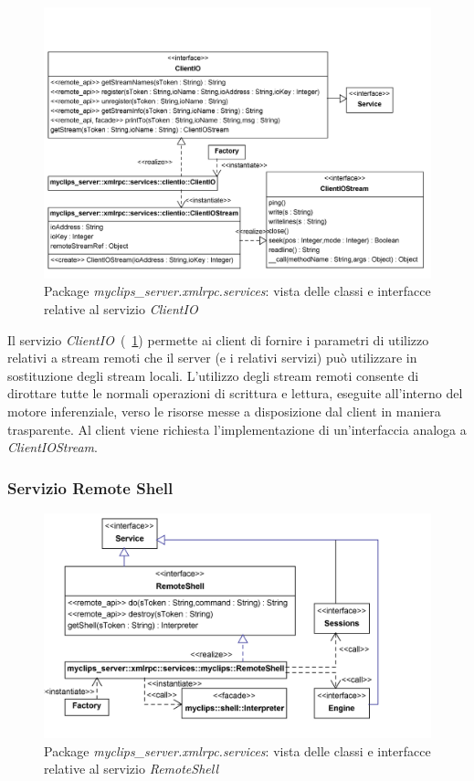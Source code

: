 \begin{figure}[h]
\centering
\includegraphics[width=1\textwidth]{Immagini/Capitolo3/Classi/myclips_server_services_ClientIO.png}
\caption{Package \emph{myclips\_server.xmlrpc.services}: vista delle classi e interfacce relative al servizio \emph{ClientIO}}\label{fig:class-myclips-server-services-clientio}
\end{figure}

Il servizio \emph{ClientIO}~(\figurename~\ref{fig:class-myclips-server-services-clientio}) permette ai client di fornire i parametri di utilizzo relativi a stream remoti che il server  (e i relativi servizi) può utilizzare in sostituzione degli stream locali. L'utilizzo degli stream remoti consente di dirottare tutte le normali operazioni di scrittura e lettura, eseguite all'interno del motore inferenziale, verso le risorse messe a disposizione dal client in maniera trasparente.
Al client viene richiesta l'implementazione di un'interfaccia analoga a \emph{ClientIOStream}.

\subsubsection{Servizio Remote Shell}

\begin{figure}[h]
\centering
\includegraphics[width=1\textwidth]{Immagini/Capitolo3/Classi/myclips_server_services_RemoteShell.png}
\caption{Package \emph{myclips\_server.xmlrpc.services}: vista delle classi e interfacce relative al servizio \emph{RemoteShell}}\label{fig:class-myclips-server-services-remoteshell}
\end{figure}

